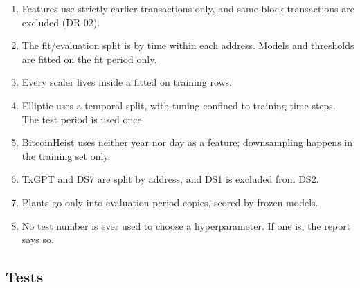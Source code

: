 \begin{enumerate}
  \item Features use strictly earlier transactions only, and same-block transactions are
    excluded (DR-02).
  \item The fit/evaluation split is by time within each address. Models and thresholds are fitted
    on the fit period only.
  \item Every scaler lives inside a  fitted on training rows.
  \item Elliptic uses a temporal split, with tuning confined to training time steps. The test
    period is used once.
  \item BitcoinHeist uses neither year nor day as a feature; downsampling happens in the training
    set only.
  \item TxGPT and DS7 are split by address, and DS1 is excluded from DS2.
  \item Plants go only into evaluation-period copies, scored by frozen models.
  \item No test number is ever used to choose a hyperparameter. If one is, the report says so.
\end{enumerate}

\subsection{Tests}
\label{sec:tests}

